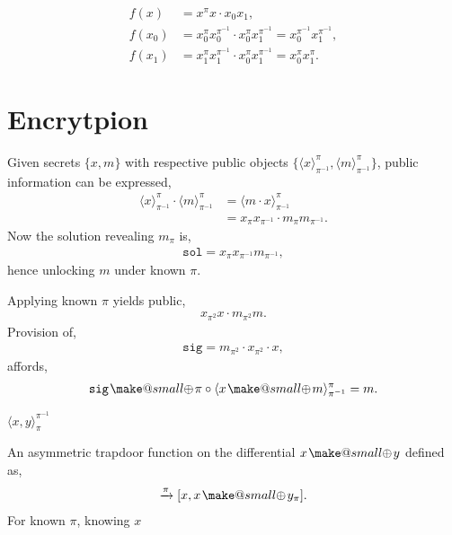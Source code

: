 \documentclass[twocolumn, aps, amsmath, amssymb, nofootinbib, superscriptaddress, longbibliography, doublefloatfix, table-of-contents, eqsecnum, rmp]{revtex4-2}
\makeatletter
\def\braid#1#2#3#4{\langle#1,#2\rangle_{#3}^{#4}}
\def\selfbraid#1#2#3{\langle#1\rangle_{#2}^{#3}}
\newcommand{\soplus}{{{\hspace{1pt}}{\mathbin{\mathpalette\make@small{\mathbin\oplus}}}}{\hspace{1pt}}}
\newcommand{\make@small}[2]{%
  \vcenter{\hbox{%
    \scalebox{0.6}{$\m@th#1#2$}%
  }}%
}
\makeatother
\begin{document}
\begin{align}
	f(x) &= x^\pi x \cdot x_0 x_1,\nonumber\\
	f(x_0) &= x_0^\pi x_0^{\pi^{-1}} \cdot x_0^\pi x_1^{\pi^{-1}} = x_0^{\pi^{-1}} x_1^{\pi^{-1}},\nonumber\\
	f(x_1) &= x_1^\pi x_1^{\pi^{-1}} \cdot x_0^\pi x_1^{\pi^{-1}} = x_0^{\pi} x_1^{\pi}.
\end{align}

\section{Encrytpion}

Given secrets $\{x,m\}$ with respective public objects $\{\selfbraid{x}{\pi^{-1}}{\pi},\selfbraid{m}{{\pi}^{-1}}{\pi}\}$, public information can be expressed,
\begin{align}
	\selfbraid{x}{\pi^{-1}}{\pi} \cdot \selfbraid{m}{{\pi}^{-1}}{\pi} &= \selfbraid{m\cdot x}{{\pi}^{-1}}{\pi} \nonumber\\
	&= x_{\pi}x_{\pi^{-1}} \cdot m_\pi m_{\pi^{-1}}.
\end{align}
Now the solution revealing $m_\pi$ is,
\begin{align}
	\mathtt{sol} = x_\pi x_{\pi^{-1}} m_{\pi^{-1}},
\end{align}
hence unlocking $m$ under known $\pi$.


Applying known $\pi$ yields public,
\begin{align}
	x_{\pi^2}x \cdot m_{\pi^2} m.
\end{align}
Provision of,
\begin{align}
	\mathtt{sig} = m_{\pi^2} \cdot x_{\pi^2} \cdot x,
\end{align}
affords,
\begin{align}
	\mathtt{sig} \soplus \pi \circ \selfbraid{x\soplus m}{\pi^{-1}}{\pi} = m.
\end{align}

$\braid{x}{y}{\pi}{\pi^{-1}}$


An asymmetric trapdoor function on the differential $x\soplus y$ defined as,
\begin{align}
	[x,x\soplus y] \xrightarrow{\pi} [x, x \soplus y_\pi].
\end{align}
For known $\pi$, knowing $x$
\end{document}

